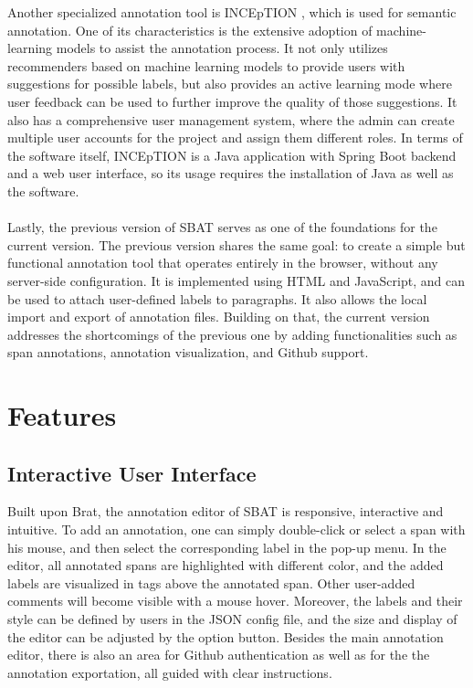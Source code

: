 \documentclass[12ptm a4paper]{article}
\begin{document}
Another specialized annotation tool is INCEpTION \citep{klie-etal-2018-inception}, which is used for semantic annotation. One of its characteristics is the extensive adoption of machine-learning models to assist the annotation process. It not only utilizes recommenders based on machine learning models to provide users with suggestions for possible labels, but also provides an active learning mode where user feedback can be used to further improve the quality of those suggestions. It also has a comprehensive user management system, where the admin can create multiple user accounts for the project and assign them different roles. In terms of the software itself, INCEpTION is a Java application with Spring Boot backend and a web user interface, so its usage requires the installation of Java as well as the software.\\
\\
Lastly, the previous version of SBAT \citep{SBAT} serves as one of the foundations for the current version. The previous version shares the same goal: to create a simple but functional annotation tool that operates entirely in the browser, without any server-side configuration. It is implemented using HTML and JavaScript, and can be used to attach user-defined labels to paragraphs. It also allows the local import and export of annotation files. Building on that, the current version addresses the shortcomings of the previous one by adding functionalities such as span annotations, annotation visualization, and Github support.
\newpage
\section{Features}
\subsection{Interactive User Interface}
Built upon Brat, the annotation editor of SBAT is responsive, interactive and intuitive. To add an annotation, one can simply double-click or select a span with his mouse, and then select the corresponding label in the pop-up menu. In the editor, all annotated spans are highlighted with different color, and the added labels are visualized in tags above the annotated span. Other user-added comments will become visible with a mouse hover. Moreover, the labels and their style can be defined by users in the JSON config file, and the size and display of the editor can be adjusted by the option button. Besides the main annotation editor, there is also an area for Github authentication as well as for the the annotation exportation, all guided with clear instructions.
\end{document}
